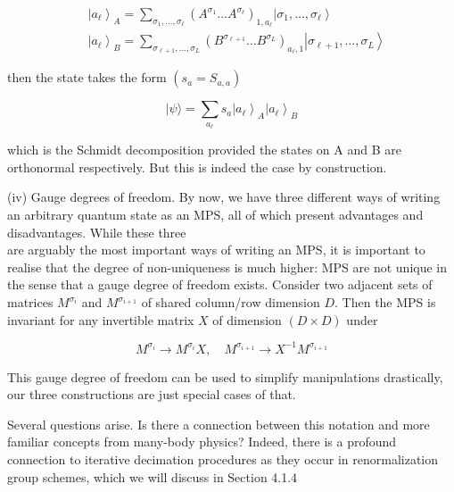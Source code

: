 \documentclass[12pt]{article}
\begin{document}
\begin{align*}
& \left|a_{\ell}\right\rangle_{A}=\sum_{\sigma_{1}, \ldots, \sigma_{\ell}}\left(A^{\sigma_{1}} \ldots A^{\sigma_{\ell}}\right)_{1, a_{\ell}}\left|\sigma_{1}, \ldots, \sigma_{\ell}\right\rangle  \tag{54}\\
& \left|a_{\ell}\right\rangle_{B}=\sum_{\sigma_{\ell+1}, \ldots, \sigma_{L}}\left(B^{\sigma_{\ell+1}} \ldots B^{\sigma_{L}}\right)_{a_{\ell}, 1}\left|\sigma_{\ell+1}, \ldots, \sigma_{L}\right\rangle \tag{55}
\end{align*}


then the state takes the form $\left(s_{a}=S_{a, a}\right)$


\begin{equation*}
|\psi\rangle=\sum_{a_{\ell}} s_{a}\left|a_{\ell}\right\rangle_{A}\left|a_{\ell}\right\rangle_{B} \tag{56}
\end{equation*}


which is the Schmidt decomposition provided the states on A and B are orthonormal respectively. But this is indeed the case by construction.

(iv) Gauge degrees of freedom. By now, we have three different ways of writing an arbitrary quantum state as an MPS, all of which present advantages and disadvantages. While these three\\
are arguably the most important ways of writing an MPS, it is important to realise that the degree of non-uniqueness is much higher: MPS are not unique in the sense that a gauge degree of freedom exists. Consider two adjacent sets of matrices $M^{\sigma_{i}}$ and $M^{\sigma_{i+1}}$ of shared column/row dimension $D$. Then the MPS is invariant for any invertible matrix $X$ of dimension $(D \times D)$ under


\begin{equation*}
M^{\sigma_{i}} \rightarrow M^{\sigma_{i}} X, \quad M^{\sigma_{i+1}} \rightarrow X^{-1} M^{\sigma_{i+1}} \tag{57}
\end{equation*}


This gauge degree of freedom can be used to simplify manipulations drastically, our three constructions are just special cases of that.

Several questions arise. Is there a connection between this notation and more familiar concepts from many-body physics? Indeed, there is a profound connection to iterative decimation procedures as they occur in renormalization group schemes, which we will discuss in Section 4.1.4
\end{document}
